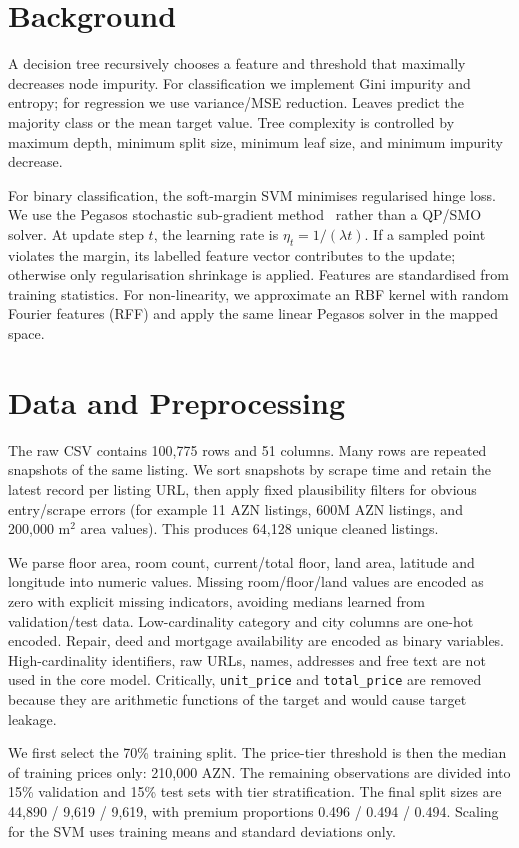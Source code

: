 \documentclass[10pt,twocolumn,a4paper]{article}
\begin{document}
\section{Background}
A decision tree recursively chooses a feature and threshold that maximally decreases node impurity. For classification we implement Gini impurity and entropy; for regression we use variance/MSE reduction. Leaves predict the majority class or the mean target value. Tree complexity is controlled by maximum depth, minimum split size, minimum leaf size, and minimum impurity decrease.

For binary classification, the soft-margin SVM minimises regularised hinge loss. We use the Pegasos stochastic sub-gradient method~\cite{pegasos} rather than a QP/SMO solver. At update step $t$, the learning rate is $\eta_t=1/(\lambda t)$. If a sampled point violates the margin, its labelled feature vector contributes to the update; otherwise only regularisation shrinkage is applied. Features are standardised from training statistics. For non-linearity, we approximate an RBF kernel with random Fourier features (RFF) and apply the same linear Pegasos solver in the mapped space.

\section{Data and Preprocessing}
The raw CSV contains 100,775 rows and 51 columns. Many rows are repeated snapshots of the same listing. We sort snapshots by scrape time and retain the latest record per listing URL, then apply fixed plausibility filters for obvious entry/scrape errors (for example 11 AZN listings, 600M AZN listings, and 200,000 m$^2$ area values). This produces 64,128 unique cleaned listings.

We parse floor area, room count, current/total floor, land area, latitude and longitude into numeric values. Missing room/floor/land values are encoded as zero with explicit missing indicators, avoiding medians learned from validation/test data. Low-cardinality category and city columns are one-hot encoded. Repair, deed and mortgage availability are encoded as binary variables. High-cardinality identifiers, raw URLs, names, addresses and free text are not used in the core model. Critically, \texttt{unit\_price} and \texttt{total\_price} are removed because they are arithmetic functions of the target and would cause target leakage.

We first select the 70\% training split. The price-tier threshold is then the median of training prices only: 210,000 AZN. The remaining observations are divided into 15\% validation and 15\% test sets with tier stratification. The final split sizes are 44,890 / 9,619 / 9,619, with premium proportions 0.496 / 0.494 / 0.494. Scaling for the SVM uses training means and standard deviations only.
\end{document}
